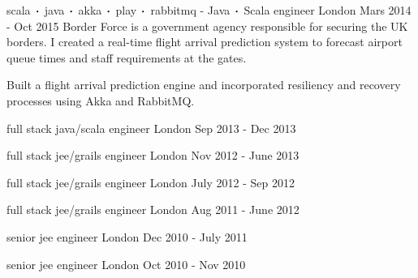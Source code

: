\begin{cventries}
    \cventry
    {scala$\sqbig$java$\sqbig$akka$\sqbig$play$\sqbig$rabbitmq}
    { - Java$\sqbig$Scala engineer}
    {London}
    {Mars 2014 - Oct 2015}
    {Border Force is a government agency responsible for securing the UK borders. I created a real-time flight arrival prediction system to forecast airport queue times and staff requirements at the gates.}
    {
        \begin{cvitems}
            \item{Built a flight arrival prediction engine and incorporated resiliency and recovery processes using Akka and RabbitMQ.}
        \end{cvitems}
    }

    \cventry
    {full stack java/scala engineer}
    {}
    {London}
    {Sep 2013 - Dec 2013}
    {}
    {}

    \cventry
    {full stack jee/grails engineer}
    {}
    {London}
    {Nov 2012 - June 2013}
    {}
    {}

    \cventry
    {full stack jee/grails engineer}
    {}
    {London}
    {July 2012 - Sep 2012}
    {}
    {}

    \cventry
    {full stack jee/grails engineer}
    {}
    {London}
    {Aug 2011 - June 2012}
    {}
    {}

    \cventry
    {senior jee engineer}
    {}
    {London}
    {Dec 2010 - July 2011}
    {}
    {}

    \cventry
    {senior jee engineer}
    {}
    {London}
    {Oct 2010 - Nov 2010}
    {}
    {}
\end{cventries}


